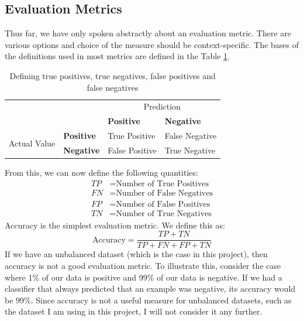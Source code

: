 \documentclass[12pt,a4paper,twoside,openright]{report}
\begin{document}
\subsection{Evaluation Metrics} \label{evaluation-metrics}
Thus far, we have only spoken abstractly about an evaluation metric. There are various options and choice of the measure should be context-specific. The bases of the definitions used in most metrics are defined in the Table \ref{table:true-positives}.
\FloatBarrier
\begin{table}[]
	\centering
	\label{table:true-positives}
	\begin{tabular}{llll}
		&                                                                    & \multicolumn{2}{c}{Prediction} \\
		& \multicolumn{1}{l|}{}                                              & \textbf{Positive}  & \textbf{Negative}  \\ \cline{2-4} 
		\multirow{2}{*}{Actual Value}&\multicolumn{1}{l|}{\textbf{Positive}} & True Positive      & False Negative     \\
		& \multicolumn{1}{l|}{\textbf{Negative}}                             & False Positive     & True Negative     
	\end{tabular}
	\caption{Defining true positives, true negatives, false positives and false negatives}
\end{table}
\FloatBarrier
From this, we can now define the following quantities:
\begin{align}
	TP & = \text{Number of True Positives} \\
	FN & = \text{Number of False Negatives} \\
	FP & = \text{Number of False Positives} \\
	TN & = \text{Number of True Negatives}
\end{align}
Accuracy is the simplest evaluation metric. We define this as:
\begin{equation}
	\text{Accuracy} = \frac{TP + TN}{TP + FN + FP + TN}
\end{equation}
If we have an unbalanced dataset (which is the case in this project), then accuracy is not a good evaluation metric. To illustrate this, consider the case where 1\% of our data is positive and 99\% of our data is negative. If we had a classifier that always predicted that an example was negative, its accuracy would be 99\%. Since accuracy is not a useful measure for unbalanced datasets, such as the dataset I am using in this project, I will not consider it any further.
\newline
\end{document}
